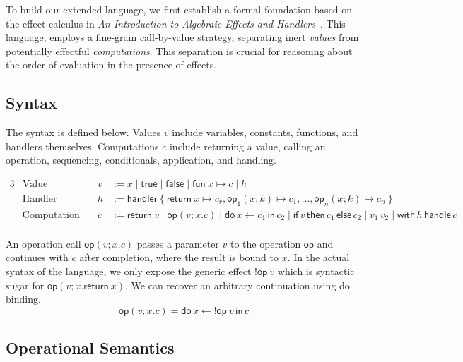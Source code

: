 \documentclass{article}
\theoremstyle{definition}
\theoremstyle{remark}
\newcommand\true{\mathsf{true}}
\newcommand\false{\mathsf{false}}
\newcommand\fun[2]{{\mathsf{fun} \ #1 \mapsto #2}}
\newcommand\handler[1]{{\mathsf{handler} \ \{ \ #1 \ \}}}
\newcommand\ret[1]{{\mathsf{return} \ #1}}
\newcommand\op{\mathsf{op}}
\newcommand{\doin}[3]{\mathsf{do}\, #1 \leftarrow #2\, \mathsf{in}\, #3}
\newcommand{\ifelse}[3]{\mathsf{if}\, #1 \,\mathsf{then} \,#2\, \mathsf{else}\, #3}
\newcommand{\with}[2]{\mathsf{with}\, #1 \,\mathsf{handle} \,#2}
\newcommand{\app}[2]{{#1 \, #2}}
\newcommand\eff{{!}}
\begin{document}
To build our extended language, we first establish a formal foundation based on the effect calculus in \emph{An Introduction to Algebraic Effects and Handlers}~\cite{pretnar_introduction_2015}.
This language, employs a fine-grain call-by-value strategy, separating inert \emph{values} from potentially effectful \emph{computations}.
This separation is crucial for reasoning about the order of evaluation in the presence of effects.

\subsection{Syntax}

The syntax is defined below. Values $v$ include variables, constants, functions, and handlers themselves.
Computations $c$ include returning a value, calling an operation, sequencing, conditionals, application, and handling.

\begin{alignat*}{3}
  &\text{Value} \quad & v &:= x \mid \true \mid \false \mid \fun x c \mid h \\
  &\text{Handler} \quad & h &:= \handler{ \ret{x} \mapsto c_r, \op_1(x;k) \mapsto c_1, \dots, \op_n(x;k) \mapsto c_n } \\
  &\text{Computation} \quad & c &:= \ret{v} \mid \op(v; x.c) \mid \doin{x}{c_1}{c_2} \mid \ifelse{v}{c_1}{c_2} \mid \app{v_1}{v_2} \mid \with{h}{c} \\
\end{alignat*}

An operation call $\op(v; x.c)$ passes a parameter $v$ to the operation $\op$ and continues with $c$ after completion, where the result is bound to $x$.
In the actual syntax of the language, we only expose the generic effect $\eff\op \ v$ which is syntactic sugar for $\op(v; x.\ret{x})$.
We can recover an arbitrary continuation using do binding.
\[
  \op(v; x.c) = \doin{x}{\eff\op \ v}{c}
\]

\subsection{Operational Semantics}
\end{document}
